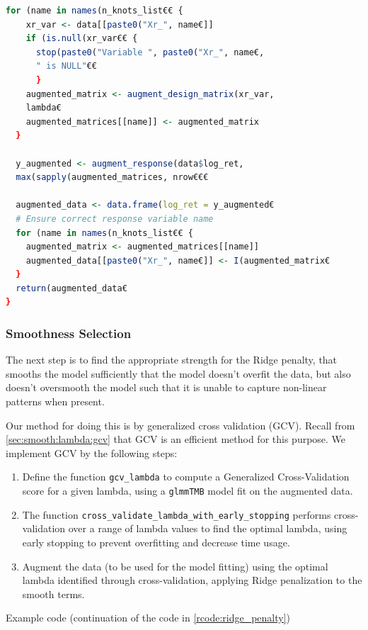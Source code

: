 \documentclass[12pt, twoside,hidelinks]{article}
\theoremstyle{definition}
\numberwithin{equation}{section}
\begin{document}
\begin{lstlisting}[language=R]
  for (name in names(n_knots_list€€ {
    xr_var <- data[[paste0("Xr_", name€]]
    if (is.null(xr_var€€ {
      stop(paste0("Variable ", paste0("Xr_", name€, 
      " is NULL"€€
      }
    augmented_matrix <- augment_design_matrix(xr_var,
    lambda€
    augmented_matrices[[name]] <- augmented_matrix
  }
  
  y_augmented <- augment_response(data$log_ret, 
  max(sapply(augmented_matrices, nrow€€€
  
  augmented_data <- data.frame(log_ret = y_augmented€
  # Ensure correct response variable name
  for (name in names(n_knots_list€€ {
    augmented_matrix <- augmented_matrices[[name]]
    augmented_data[[paste0("Xr_", name€]] <- I(augmented_matrix€
  }
  return(augmented_data€
}
\end{lstlisting}\label{rcode:ridge_penalty}

\subsubsection{Smoothness Selection}

The next step is to find the appropriate strength for the Ridge penalty, that smooths the model sufficiently that the model doesn't overfit the data, but also doesn't oversmooth the model such that it is unable to capture non-linear patterns when present. 
\newline

Our method for doing this is by generalized cross validation (GCV). Recall from \ref{sec:smooth:lambda:gcv} that GCV is an efficient method for this purpose. We implement GCV by the following steps: 

\begin{enumerate}
    \item Define the function \texttt{gcv\_lambda} to compute a Generalized Cross-Validation score for a given lambda, using a \texttt{glmmTMB} model fit on the augmented data.
    \item The function \texttt{cross\_validate\_lambda\_with\_early\_stopping} performs cross-validation over a range of lambda values to find the optimal lambda, using early stopping to prevent overfitting and decrease time usage.
    \item Augment the data (to be used for the model fitting) using the optimal lambda identified through cross-validation, applying Ridge penalization to the smooth terms.
\end{enumerate}

Example code (continuation of the code in \ref{rcode:ridge_penalty})
\end{document}

